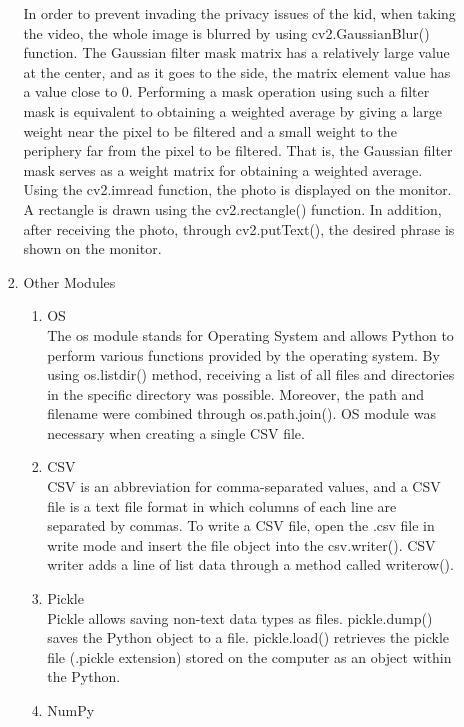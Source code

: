 \documentclass[conference]{IEEEtran}
\begin{document}
\begin{enumerate}[label=\arabic*.]
\begin{enumerate}[label=\arabic*.]
\begin{enumerate}[label=\alph*.]
        In order to prevent invading the privacy issues of the kid, when taking the video, the whole image is blurred by using cv2.GaussianBlur() function. The Gaussian filter mask matrix has a relatively large value at the center, and as it goes to the side, the matrix element value has a value close to 0. Performing a mask operation using such a filter mask is equivalent to obtaining a weighted average by giving a large weight near the pixel to be filtered and a small weight to the periphery far from the pixel to be filtered. That is, the Gaussian filter mask serves as a weight matrix for obtaining a weighted average. \\
        Using the cv2.imread function, the photo is displayed on the monitor. A rectangle is drawn using the cv2.rectangle() function. In addition, after receiving the photo, through cv2.putText(), the desired phrase is shown on the monitor. \\
        \item{\large{Other Modules}}\\ 
        \begin{enumerate}[label=\roman*.]
            \item{\large{OS}}\\ 
            The os module stands for Operating System and allows Python to perform various functions provided by the operating system. By using os.listdir() method, receiving a list of all files and directories in the specific directory was possible. Moreover, the path and filename were combined through os.path.join(). OS module was necessary when creating a single CSV file.\\
            \item{\large{CSV}}\\ 
            CSV is an abbreviation for comma-separated values, and a CSV file is a text file format in which columns of each line are separated by commas. To write a CSV file, open the .csv file in write mode and insert the file object into the csv.writer(). CSV writer adds a line of list data through a method called writerow(). \\
            \item{\large{Pickle}}\\ 
            Pickle allows saving non-text data types as files. pickle.dump() saves the Python object to a file. pickle.load() retrieves the pickle file (.pickle extension) stored on the computer as an object within the Python. \\
            \item{\large{NumPy}}\\ 

\end{enumerate}
\end{enumerate}
\end{enumerate}
\end{enumerate}
\end{document}
